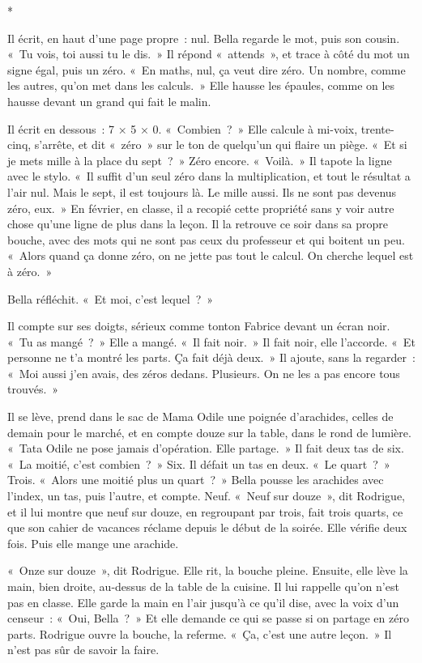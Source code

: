 \documentclass[10.5pt,twoside,openright]{book}
\newcommand{\asterisme}{\par\vspace{0.7em}\centerline{\color{gris}*\quad*\quad*}\vspace{0.7em}\par\noindent}
\begin{document}
\asterisme

Il écrit, en haut d’une page propre : nul. Bella regarde le mot, puis son cousin. « Tu vois, toi aussi tu le dis. » Il répond « attends », et trace à côté du mot un signe égal, puis un zéro. « En maths, nul, ça veut dire zéro. Un nombre, comme les autres, qu’on met dans les calculs. » Elle hausse les épaules, comme on les hausse devant un grand qui fait le malin.

Il écrit en dessous : 7 × 5 × 0. « Combien ? » Elle calcule à mi-voix, trente-cinq, s’arrête, et dit « zéro » sur le ton de quelqu’un qui flaire un piège. « Et si je mets mille à la place du sept ? » Zéro encore. « Voilà. » Il tapote la ligne avec le stylo. « Il suffit d’un seul zéro dans la multiplication, et tout le résultat a l’air nul. Mais le sept, il est toujours là. Le mille aussi. Ils ne sont pas devenus zéro, eux. » En février, en classe, il a recopié cette propriété sans y voir autre chose qu’une ligne de plus dans la leçon. Il la retrouve ce soir dans sa propre bouche, avec des mots qui ne sont pas ceux du professeur et qui boitent un peu. « Alors quand ça donne zéro, on ne jette pas tout le calcul. On cherche lequel est à zéro. »

Bella réfléchit. « Et moi, c’est lequel ? »

Il compte sur ses doigts, sérieux comme tonton Fabrice devant un écran noir. « Tu as mangé ? » Elle a mangé. « Il fait noir. » Il fait noir, elle l’accorde. « Et personne ne t’a montré les parts. Ça fait déjà deux. » Il ajoute, sans la regarder : « Moi aussi j’en avais, des zéros dedans. Plusieurs. On ne les a pas encore tous trouvés. »

Il se lève, prend dans le sac de Mama Odile une poignée d’arachides, celles de demain pour le marché, et en compte douze sur la table, dans le rond de lumière. « Tata Odile ne pose jamais d’opération. Elle partage. » Il fait deux tas de six. « La moitié, c’est combien ? » Six. Il défait un tas en deux. « Le quart ? » Trois. « Alors une moitié plus un quart ? » Bella pousse les arachides avec l’index, un tas, puis l’autre, et compte. Neuf. « Neuf sur douze », dit Rodrigue, et il lui montre que neuf sur douze, en regroupant par trois, fait trois quarts, ce que son cahier de vacances réclame depuis le début de la soirée. Elle vérifie deux fois. Puis elle mange une arachide.

« Onze sur douze », dit Rodrigue. Elle rit, la bouche pleine. Ensuite, elle lève la main, bien droite, au-dessus de la table de la cuisine. Il lui rappelle qu’on n’est pas en classe. Elle garde la main en l’air jusqu’à ce qu’il dise, avec la voix d’un censeur : « Oui, Bella ? » Et elle demande ce qui se passe si on partage en zéro parts. Rodrigue ouvre la bouche, la referme. « Ça, c’est une autre leçon. » Il n’est pas sûr de savoir la faire.
\end{document}
